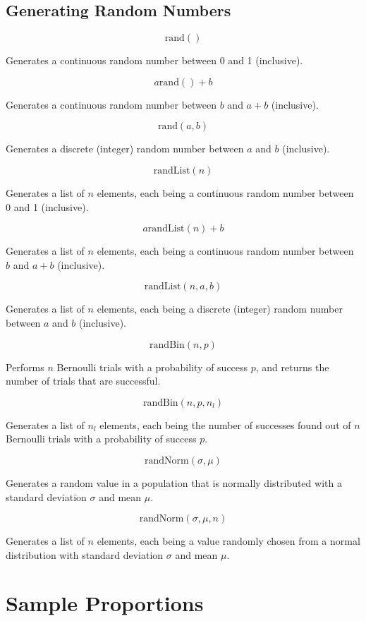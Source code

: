 \documentclass[a4paper,11pt]{article}
\begin{document}
\subsection{Generating Random Numbers}

$$
\text{rand}()
$$

Generates a continuous random number between 0 and 1 (inclusive).

$$
a\text{rand}() + b
$$

Generates a continuous random number between $b$ and $a + b$ (inclusive).

$$
\text{rand}(a, b)
$$

Generates a discrete (integer) random number between $a$ and $b$ (inclusive).

$$
\text{randList}(n)
$$

Generates a list of $n$ elements, each being a continuous random number between
0 and 1 (inclusive).

$$
a \text{randList}(n) + b
$$

Generates a list of $n$ elements, each being a continuous random number between
$b$ and $a + b$ (inclusive).

$$
\text{randList}(n, a, b)
$$

Generates a list of $n$ elements, each being a discrete (integer) random number
between $a$ and $b$ (inclusive).

$$
\text{randBin}(n, p)
$$

Performs $n$ Bernoulli trials with a probability of success $p$, and returns the
number of trials that are successful.

$$
\text{randBin}(n, p, n_l)
$$

Generates a list of $n_l$ elements, each being the number of successes found out
of $n$ Bernoulli trials with a probability of success $p$.

$$
\text{randNorm}(\sigma, \mu)
$$

Generates a random value in a population that is normally distributed with a
standard deviation $\sigma$ and mean $\mu$.

$$
\text{randNorm}(\sigma, \mu, n)
$$

Generates a list of $n$ elements, each being a value randomly chosen from a
normal distribution with standard deviation $\sigma$ and mean $\mu$.



\section{Sample Proportions}
\end{document}
